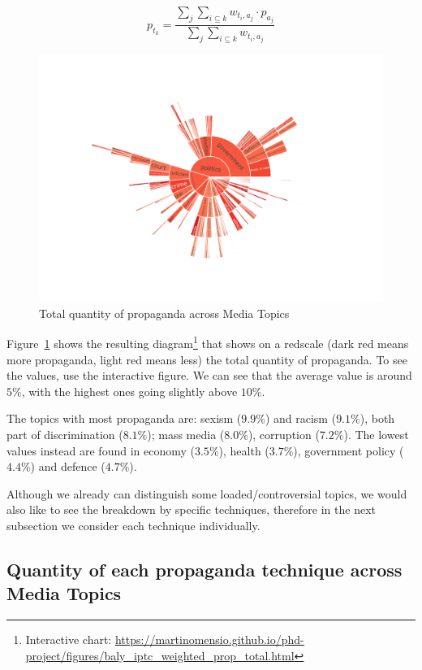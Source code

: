 $$ p_{t_{k}} = \frac{ \sum_{j} \sum_{i\subseteq k} w_{t_{i},a_{j}} \cdot p_{a_{j}} }{ \sum_{j} \sum_{i\subseteq k} w_{t_{i},a_{j}} } $$

\begin{figure}[!htbp]
    \centering
    \includegraphics[trim={2.2cm 2cm 2.2cm 2cm},clip,width=\linewidth]{figures/baly_iptc_weighted_prop_total.pdf}
    \caption{Total quantity of propaganda across Media Topics}
    \label{fig:baly_iptc_weighted_prop_total}
\end{figure}

Figure~\ref{fig:baly_iptc_weighted_prop_total} shows the resulting diagram\footnote{Interactive chart: \url{https://martinomensio.github.io/phd-project/figures/baly_iptc_weighted_prop_total.html}} that shows on a redscale (dark red means more propaganda, light red means less) the total quantity of propaganda. To see the values, use the interactive figure.
We can see that the average value is around $5\%$, with the highest ones going slightly above $10\%$.

The topics with most propaganda are: sexism ($9.9\%$) and racism ($9.1\%$), both part of discrimination ($8.1\%$); mass media ($8.0\%$), corruption ($7.2\%$). The lowest values instead are found in economy ($3.5\%$), health ($3.7\%$), government policy ($4.4\%$) and defence ($4.7\%$).

Although we already can distinguish some loaded/controversial topics, we would also like to see the breakdown by specific techniques, therefore in the next subsection we consider each technique individually.

\subsection{\statusgreen Quantity of each propaganda technique across Media Topics}
\label{sec:topic_propaganda_tech}

